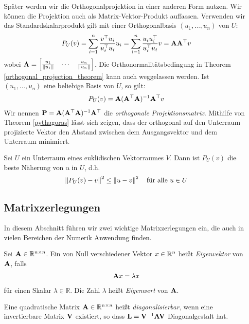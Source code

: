 Später werden wir die Orthogonalprojektion in einer anderen Form nutzen. Wir können die Projektion auch als Matrix-Vektor-Produkt auffassen. Verwenden wir das Standardskalarprodukt gilt mit einer Orthogonalbasis $(u_1, \ldots, u_n)$ von $U$:
\begin{align}
P_U(v) = \sum_{i=1}^n \frac{v^{\top} u_i}{u_i^{\top} u_i} u_i = \sum_{i=1}^n \frac{u_i u_i^{\top}}{u_i^{\top} u_i}v = \mathbf{A} \mathbf{A}^{\top} v
\end{align}
wobei $\mathbf{A} = \begin{bmatrix} \frac{u_1}{\left\lVert u_1 \right\rVert} & \cdots & \frac{u_n}{\left\lVert u_n \right\rVert} \end{bmatrix}$. Die Orthonormalitätsbedingung in Theorem \ref{orthogonal_projection_theorem} kann auch weggelassen werden. Ist $(u_{1},\ldots ,u_{n})$ eine beliebige Basis von $U$, so gilt:
\begin{align}
P_U(v) = \mathbf{A} (\mathbf{A}^\top \mathbf{A})^{-1} \mathbf{A}^\top v
\end{align}
Wir nennen $\mathbf{P} = \mathbf{A} (\mathbf{A}^\top \mathbf{A})^{-1} \mathbf{A}^\top$ die \textit{orthogonale Projektionsmatrix}. Mithilfe von Theorem \ref{pythagoras} lässt sich zeigen, dass der orthogonal auf den Unterraum projizierte Vektor den Abstand zwischen dem Ausgangsvektor und dem Unterraum minimiert.

\begin{thm}
Sei $U$ ein Unterraum eines euklidischen Vektorraumes $V$. Dann ist $P_U(v)$ die beste Näherung von $u$ in $U$, d.h.
$$\left\lVert P_U(v) - v \right\rVert^2 \leq \left\lVert u - v \right\rVert^2 \quad \text{für alle } u \in U$$
\end{thm}


\subsection{Matrixzerlegungen}
\label{matrix_decomposition}

In diesem Abschnitt führen wir zwei wichtige Matrixzerlegungen ein, die auch in vielen Bereichen der Numerik Anwendung finden.

\begin{defn}
Sei $\mathbf{A} \in \mathbb{R}^{n \times n}$. Ein von Null verschiedener Vektor $x \in \mathbb{R}^n$ heißt \textit{Eigenvektor} von $\mathbf{A}$, falls
$$\mathbf{A}x = \lambda x$$
für einen Skalar $\lambda \in \mathbb{R}$. Die Zahl $\lambda$ heißt \textit{Eigenwert} von $\mathbf{A}$.
\end{defn}

\begin{defn}
Eine quadratische Matrix $\mathbf{A} \in \mathbb{R}^{n \times n}$ heißt \textit{diagonalisierbar}, wenn eine invertierbare Matrix $\mathbf{V}$ existiert, so dass $\mathbf{L} = \mathbf{V}^{-1}\mathbf{A}\mathbf{V}$ Diagonalgestalt hat.
\end{defn}

